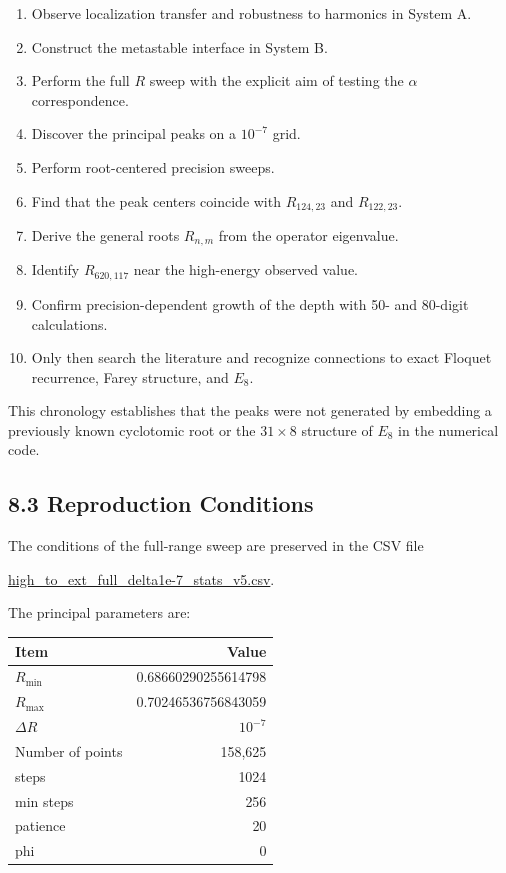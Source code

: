 \documentclass[
  10pt,
  a4paper,
]{article}
\newcounter{none} %
\providecommand{\tightlist}{%
  \setlength{\itemsep}{0pt}\setlength{\parskip}{0pt}}
\begin{document}
\begin{enumerate}
\def\labelenumi{\arabic{enumi}.}
\tightlist
\item
  Observe localization transfer and robustness to harmonics in System A.
\item
  Construct the metastable interface in System B.
\item
  Perform the full \(R\) sweep with the explicit aim of testing the
  \(\alpha\) correspondence.
\item
  Discover the principal peaks on a \(10^{-7}\) grid.
\item
  Perform root-centered precision sweeps.
\item
  Find that the peak centers coincide with \(R_{124,23}\) and
  \(R_{122,23}\).
\item
  Derive the general roots \(R_{n,m}\) from the operator eigenvalue.
\item
  Identify \(R_{620,117}\) near the high-energy observed value.
\item
  Confirm precision-dependent growth of the depth with 50- and 80-digit
  calculations.
\item
  Only then search the literature and recognize connections to exact
  Floquet recurrence, Farey structure, and \(E_8\).
\end{enumerate}

This chronology establishes that the peaks were not generated by
embedding a previously known cyclotomic root or the \(31\times8\)
structure of \(E_8\) in the numerical code.

\subsection{8.3 Reproduction Conditions}\label{reproduction-conditions}

The conditions of the full-range sweep are preserved in the CSV file

\href{../20260715/minimal_system_B_gray_bugcheck_result_v1/direct_depth_probe_v5_sweep_control/high_to_ext_full_delta1e-7_stats_v5.csv}{high\_to\_ext\_full\_delta1e-7\_stats\_v5.csv}.

The principal parameters are:

{\def\LTcaptype{none} %
\begin{longtable}[]{@{}lr@{}}
\toprule\noalign{}
Item & Value \\
\midrule\noalign{}
\endhead
\bottomrule\noalign{}
\endlastfoot
\(R_{\min}\) & 0.68660290255614798 \\
\(R_{\max}\) & 0.70246536756843059 \\
\(\Delta R\) & \(10^{-7}\) \\
Number of points & 158,625 \\
steps & 1024 \\
min steps & 256 \\
patience & 20 \\
phi & 0 \\
\end{longtable}
}
\end{document}
